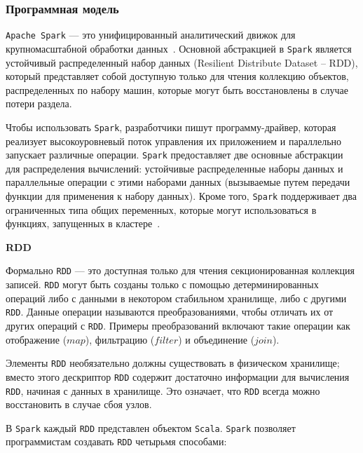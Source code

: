 \subsubsection{Программная модель}

\texttt{Apache Spark} --- это унифицированный аналитический движок для крупномасштабной обработки данных~\cite{apache-spark}.
Основной абстракцией в \texttt{Spark} является устойчивый распределенный набор данных (Resilient Distribute Dataset -- RDD), который представляет собой доступную только для чтения коллекцию объектов, распределенных по набору машин, которые могут быть восстановлены в случае потери раздела.

Чтобы использовать \texttt{Spark}, разработчики пишут программу-драйвер, которая реализует высокоуровневый поток управления их приложением и параллельно запускает различные операции. 
\texttt{Spark} предоставляет две основные абстракции для распределения вычислений: устойчивые распределенные наборы данных и параллельные операции с этими наборами данных (вызываемые путем передачи функции для применения к набору данных).
Кроме того, \texttt{Spark} поддерживает два ограниченных типа общих переменных, которые могут использоваться в функциях, запущенных в кластере~\cite{180560}.

\textbf{RDD}

Формально \texttt{RDD} --- это доступная только для чтения секционированная коллекция записей. 
\texttt{RDD} могут быть созданы только с помощью детерминированных операций либо с данными в некотором стабильном хранилище, либо с другими \texttt{RDD}. 
Данные операции называются преобразованиями, чтобы отличать их от других операций с \texttt{RDD}. 
Примеры преобразований включают такие операции как отображение ($map$), фильтрацию ($filter$) и объединение ($join$).

Элементы \texttt{RDD} необязательно должны существовать в физическом хранилище; 
вместо этого дескриптор \texttt{RDD} содержит достаточно информации для вычисления \texttt{RDD}, начиная с данных в хранилище. 
Это означает, что \texttt{RDD} всегда можно восстановить в случае сбоя узлов. 

В \texttt{Spark} каждый \texttt{RDD} представлен объектом \texttt{Scala}.
\texttt{Spark} позволяет программистам создавать \texttt{RDD} четырьмя способами:

